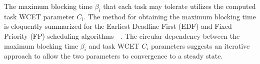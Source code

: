 \noindent
The maximum blocking time \begin{math}\beta_{i}\end{math} that each task may tolerate utilizes the computed task WCET parameter \begin{math}C_{i}\end{math}.  The method for obtaining the maximum blocking time is eloquently summarized for the Earliest Deadline First (EDF) and Fixed Priority (FP) scheduling algorithms~\cite{bertogna:11}~\cite{bertogna:10}.  The circular dependency between the maximum blocking time \begin{math}\beta_{i}\end{math} and task WCET \begin{math}C_{i}\end{math} parameters suggests an iterative approach to allow the two parameters to convergence to a steady state.

